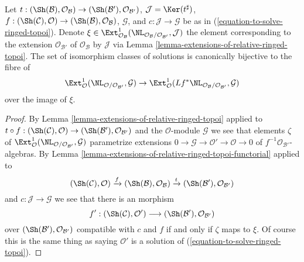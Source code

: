\begin{lemma}
\label{lemma-parametrize-solutions-ringed-topoi}
Let $t : (\Sh(\mathcal{B}), \mathcal{O}_\mathcal{B}) \to
(\Sh(\mathcal{B}'), \mathcal{O}_{\mathcal{B}'})$,
$\mathcal{J} = \Ker(t^\sharp)$,
$f : (\Sh(\mathcal{C}), \mathcal{O}) \to
(\Sh(\mathcal{B}), \mathcal{O}_\mathcal{B})$, $\mathcal{G}$, and
$c : \mathcal{J} \to \mathcal{G}$ be as in
(\ref{equation-to-solve-ringed-topoi}).
Denote $\xi \in \Ext^1_{\mathcal{O}_\mathcal{B}}(
\NL_{\mathcal{O}_\mathcal{B}/\mathcal{O}_{\mathcal{B}'}}, \mathcal{J})$
the element corresponding to the extension $\mathcal{O}_{\mathcal{B}'}$
of $\mathcal{O}_\mathcal{B}$ by $\mathcal{J}$ via
Lemma \ref{lemma-extensions-of-relative-ringed-topoi}.
The set of isomorphism classes of solutions is canonically bijective
to the fibre of
$$
\Ext^1_\mathcal{O}(\NL_{\mathcal{O}/\mathcal{O}_{\mathcal{B}'}},
\mathcal{G})\to
\Ext^1_\mathcal{O}(
Lf^*\NL_{\mathcal{O}_\mathcal{B}/\mathcal{O}_{\mathcal{B}'}}, \mathcal{G})
$$
over the image of $\xi$.
\end{lemma}

\begin{proof}
By Lemma \ref{lemma-extensions-of-relative-ringed-topoi}
applied to $t \circ f : (\Sh(\mathcal{C}), \mathcal{O}) \to
(\Sh(\mathcal{B}'), \mathcal{O}_{\mathcal{B}'})$
and the $\mathcal{O}$-module $\mathcal{G}$
we see that elements $\zeta$ of
$\Ext^1_\mathcal{O}(\NL_{\mathcal{O}/\mathcal{O}_{\mathcal{B}'}},
\mathcal{G})$
parametrize extensions
$0 \to \mathcal{G} \to \mathcal{O}' \to \mathcal{O} \to 0$
of $f^{-1}\mathcal{O}_{\mathcal{B}'}$-algebras. By
Lemma \ref{lemma-extensions-of-relative-ringed-topoi-functorial} applied
to
$$
(\Sh(\mathcal{C}), \mathcal{O}) \xrightarrow{f}
(\Sh(\mathcal{B}), \mathcal{O}_\mathcal{B}) \xrightarrow{t}
(\Sh(\mathcal{B}'), \mathcal{O}_{\mathcal{B}'})
$$
and $c : \mathcal{J} \to \mathcal{G}$
we see that there is an morphism
$$
f' : 
(\Sh(\mathcal{C}), \mathcal{O}')
\longrightarrow
(\Sh(\mathcal{B}'), \mathcal{O}_{\mathcal{B}'})
$$
over $(\Sh(\mathcal{B}'), \mathcal{O}_{\mathcal{B}'})$
compatible with $c$ and $f$ if and only if
$\zeta$ maps to $\xi$. Of course this is the same thing as saying
$\mathcal{O}'$ is a solution of (\ref{equation-to-solve-ringed-topoi}).
\end{proof}























